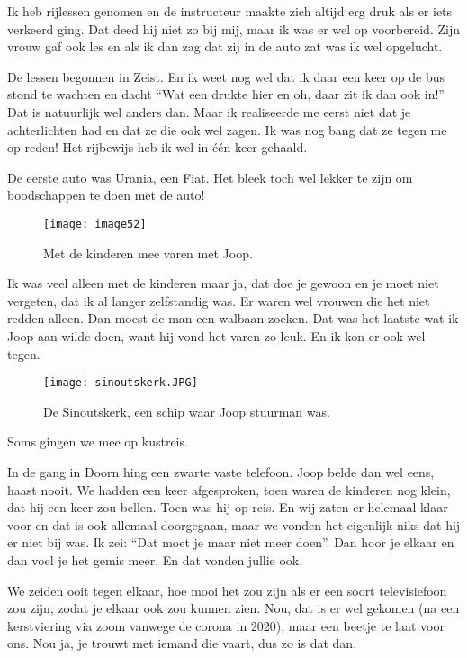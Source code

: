 Ik heb rijlessen genomen en de instructeur maakte zich altijd erg druk als er iets verkeerd ging. Dat deed hij niet zo bij mij, maar ik was er wel op voorbereid. Zijn vrouw gaf ook les en als ik dan zag dat zij in de auto zat was ik wel opgelucht. 

De lessen begonnen in Zeist. En ik weet nog wel dat ik daar een keer op de bus stond te wachten en dacht ``Wat een drukte hier en oh, daar zit ik dan ook in!'' Dat is natuurlijk wel anders dan. Maar ik realiseerde me eerst niet dat je achterlichten had en dat ze die ook wel zagen. Ik was nog bang dat ze tegen me op reden! Het rijbewijs heb ik wel in \'{e}\'{e}n keer gehaald.~

De eerste auto was Urania, een Fiat. Het bleek toch wel lekker te zijn om boodschappen te doen met de auto!

\begin{figure}[h]
    \texttt{[image: image52]}
    \caption{Met de kinderen mee varen met Joop.}
\end{figure}

Ik was veel alleen met de kinderen maar ja, dat doe je gewoon en je moet niet vergeten, dat ik al langer zelfstandig was. Er waren wel vrouwen die het niet redden alleen. Dan moest de man een walbaan zoeken. Dat was het laatste wat ik Joop aan wilde doen, want hij vond het varen zo leuk. En ik kon er ook wel tegen.

\begin{figure}[h]
    \begin{centering}
    \texttt{[image: sinoutskerk.JPG]}
    \caption{De Sinoutskerk, een schip waar Joop stuurman was.}
    \end{centering}
\end{figure}

Soms gingen we mee op kustreis. 

In de gang in Doorn hing een zwarte vaste telefoon. Joop belde dan wel eens, haast nooit. We hadden een keer afgesproken, toen waren de kinderen nog klein, dat hij een keer zou bellen. Toen was hij op reis. En wij zaten er helemaal klaar voor en dat is ook allemaal doorgegaan, maar we vonden het eigenlijk niks dat hij er niet bij was. Ik zei: ``Dat moet je maar niet meer doen''. Dan hoor je elkaar en dan voel je het gemis meer. En dat vonden jullie ook. 

We zeiden ooit tegen elkaar, hoe mooi het zou zijn als er een soort televisiefoon zou zijn, zodat je elkaar ook zou kunnen zien. Nou, dat is er wel gekomen (na een kerstviering via zoom vanwege de corona in 2020), maar een beetje te laat voor ons. Nou ja, je trouwt met iemand die vaart, dus zo is dat dan.

